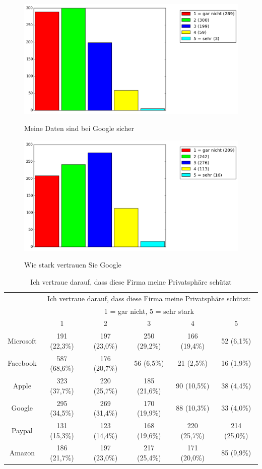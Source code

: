\begin{figure}[H]
\centering
\includegraphics[scale=0.55]{images/datensicher}\\
\caption{Meine Daten sind bei Google sicher}\label{datensicher}
\end{figure}
\begin{figure}[H]
\centering
\includegraphics[scale=0.55]{images/vertrauen}\\
\caption{Wie stark vertrauen Sie Google}\label{vertrauen}
\end{figure}
\begin{table}
	\begin{tabular}[]{ c || c | c | c | c | c }
	& \multicolumn{5}{c}{Ich vertraue darauf, dass diese Firma meine Privatsphäre schützt:}\\
	& \multicolumn{5}{c}{1 = gar nicht, 5 = sehr stark}\\
	& 1 & 2 & 3 & 4 & 5\\ \hline \hline
	Microsoft & 191 (22,3\%) & 197 (23,0\%) & 250 (29,2\%) & 166 (19,4\%) & 52 (6,1\%)\\ \hline
	Facebook & 587 (68,6\%) & 176 (20,7\%) & 56 (6,5\%) & 21 (2,5\%) & 16 (1,9\%)\\ \hline
	Apple & 323 (37,7\%) & 220 (25,7\%) & 185 (21,6\%) & 90 (10,5\%) & 38 (4,4\%)\\ \hline
	Google & 295 (34,5\%) & 269 (31,4\%) & 170 (19,9\%) & 88 (10,3\%) & 33 (4,0\%)\\ \hline
	Paypal & 131 (15,3\%) & 123 (14,4\%) & 168 (19,6\%) & 220 (25,7\%) & 214 (25,0\%)\\ \hline
	Amazon & 186 (21,7\%) & 197 (23,0\%) & 217 (25,4\%) & 171 (20,0\%) & 85 (9,9\%)\\
	\end{tabular}
	\caption{Ich vertraue darauf, dass diese Firma meine Privatsphäre schützt}\label{vertrauenothers}
\end{table}

